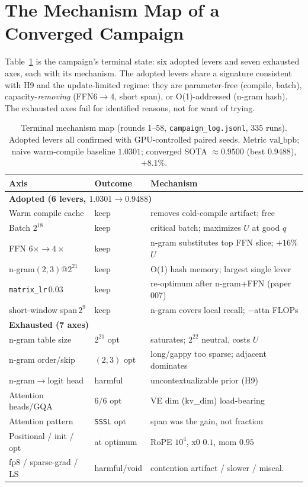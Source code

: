 \documentclass{article}
\newcommand{\valbpb}{\mathrm{val\_bpb}}
\begin{document}
\section{The Mechanism Map of a Converged Campaign}
\label{sec:map}

Table~\ref{tab:map} is the campaign's terminal state: six adopted levers and seven exhausted axes, each with its mechanism. The adopted levers share a signature consistent with H9 and the update-limited regime: they are parameter-free (compile, batch), capacity-\emph{removing} (FFN$6\to4$, short span), or O(1)-addressed (n-gram hash). The exhausted axes fail for identified reasons, not for want of trying.

\begin{table}[t]
\caption{Terminal mechanism map (rounds 1--58, \texttt{campaign\_log.jsonl}, 335 runs). Adopted levers all confirmed with GPU-controlled paired seeds. Metric $\valbpb$; naive warm-compile baseline $1.0301$; converged SOTA $\approx0.9500$ (best $0.9488$), $+8.1\%$.}
\label{tab:map}
\vskip 0.15in
\begin{center}
\begin{scriptsize}
\setlength{\tabcolsep}{3pt}
\begin{tabular}{lll}
\toprule
Axis & Outcome & Mechanism \\
\midrule
\multicolumn{3}{l}{\textbf{Adopted (6 levers, $1.0301\to0.9488$)}} \\
Warm compile cache & keep & removes cold-compile artifact; free \\
Batch $2^{18}$ & keep & critical batch; maximizes $U$ at good $q$ \\
FFN $6\times\to4\times$ & keep & n-gram substitutes top FFN slice; $+16\%$ $U$ \\
n-gram$(2,3)$@$2^{21}$ & keep & O(1) hash memory; largest single lever \\
\texttt{matrix\_lr}\,$0.03$ & keep & re-optimum after n-gram+FFN (paper 007) \\
short-window span\,$2^{9}$ & keep & n-gram covers local recall; $-$attn FLOPs \\
\midrule
\multicolumn{3}{l}{\textbf{Exhausted (7 axes)}} \\
n-gram table size & $2^{21}$ opt & saturates; $2^{22}$ neutral, costs $U$ \\
n-gram order/skip & $(2,3)$ opt & long/gappy too sparse; adjacent dominates \\
n-gram$\to$logit head & harmful & uncontextualizable prior (H9) \\
Attention heads/GQA & $6/6$ opt & VE dim (kv\_dim) load-bearing \\
Attention pattern & \texttt{SSSL} opt & span was the gain, not fraction \\
Positional / init / opt & at optimum & RoPE $10^4$, x0 $0.1$, mom $0.95$ \\
fp8 / sparse-grad / LS & harmful/void & contention artifact / slower / miscal.\ \\
\bottomrule
\end{tabular}
\end{scriptsize}
\end{center}
\vskip -0.1in
\end{table}
\end{document}
